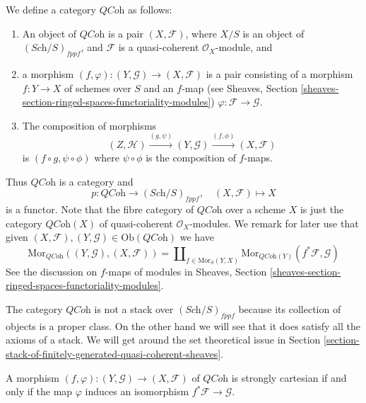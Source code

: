 \noindent
We define a category $\textit{QCoh}$ as follows:
\begin{enumerate}
\item An object of $\textit{QCoh}$ is a pair $(X, \mathcal{F})$,
where $X/S$ is an object of $(\textit{Sch}/S)_{fppf}$, and $\mathcal{F}$
is a quasi-coherent $\mathcal{O}_X$-module, and
\item a morphism $(f, \varphi) : (Y, \mathcal{G}) \to (X, \mathcal{F})$
is a pair consisting of a morphism $f : Y \to X$ of schemes over $S$
and an $f$-map (see
Sheaves, Section \ref{sheaves-section-ringed-spaces-functoriality-modules})
$\varphi : \mathcal{F} \to \mathcal{G}$.
\item The composition of morphisms
$$
(Z, \mathcal{H}) \xrightarrow{(g, \psi)}
(Y, \mathcal{G}) \xrightarrow{(f, \phi)} (X, \mathcal{F})
$$
is $(f \circ g, \psi \circ \phi)$ where $\psi \circ \phi$ is
the composition of $f$-maps.
\end{enumerate}
Thus $\textit{QCoh}$ is a category and
$$
p : \textit{QCoh} \to (\textit{Sch}/S)_{fppf},
\quad
(X, \mathcal{F}) \mapsto X
$$
is a functor. Note that the fibre category of $\textit{QCoh}$ over
a scheme $X$ is just the category $\textit{QCoh}(X)$
of quasi-coherent $\mathcal{O}_X$-modules.
We remark for later use that given
$(X, \mathcal{F}), (Y, \mathcal{G}) \in \text{Ob}(\textit{QCoh})$
we have
\begin{equation}
\label{equation-morphisms-qcoh}
\text{Mor}_{\textit{QCoh}}((Y, \mathcal{G}), (X, \mathcal{F}))
=
\coprod\nolimits_{f \in \text{Mor}_S(Y, X)}
\text{Mor}_{\textit{QCoh}(Y)}(f^*\mathcal{F}, \mathcal{G})
\end{equation}
See the discussion on $f$-maps of modules in
Sheaves, Section \ref{sheaves-section-ringed-spaces-functoriality-modules}.

\medskip\noindent
The category $\textit{QCoh}$ is not a stack over $(\textit{Sch}/S)_{fppf}$
because its collection of objects is a proper class. On the other hand
we will see that it does satisfy all the axioms of a stack. We will
get around the set theoretical issue in
Section \ref{section-stack-of-finitely-generated-quasi-coherent-sheaves}.

\begin{lemma}
\label{lemma-quasi-coherent-strongly-cartesian}
A morphism $(f, \varphi) : (Y, \mathcal{G}) \to (X, \mathcal{F})$
of $\textit{QCoh}$ is strongly cartesian if and only if the
map $\varphi$ induces an isomorphism $f^*\mathcal{F} \to \mathcal{G}$.
\end{lemma}

